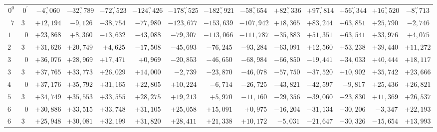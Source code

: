 \begin{landscape}
\begin{longtable}{@{}rr|r|r|r|r|r|r|r|r|r|r|r|r@{}}
\hline
\endhead
\(0^0\) & \(0^\prime\) & \(-4\overset{\prime\prime}{,}060\) & \(-32\overset{\prime\prime}{,}789\) & \(-72\overset{\prime\prime}{,}523\) & \(-124\overset{\prime\prime}{,}426\) & \(-178\overset{\prime\prime}{,}525\) & \(-182\overset{\prime\prime}{,}921\) & \(-58\overset{\prime\prime}{,}654\) & \(+82\overset{\prime\prime}{,}336\) & \(+97\overset{\prime\prime}{,}814\) & \(+56\overset{\prime\prime}{,}344\) & \(+16\overset{\prime\prime}{,}520\) & \(-8\overset{\prime\prime}{,}713\)\\
\(7\) & \(30\) & \(+12{,}194\) & \(-9{,}126\) & \(-38{,}754\) & \(-77{,}980\) & \(-123{,}677\) & \(-153{,}639\) & \(-107{,}942\) & \(+18{,}365\) & \(+83{,}244\) & \(+63{,}851\) & \(+25{,}790\) & \(-2{,}746\)\\
\(15\) & \(0\) & \(+23{,}868\) & \(+8{,}360\) & \(-13{,}632\) & \(-43{,}088\) & \(-79{,}307\) & \(-113{,}066\) & \(-111{,}787\) & \(-35{,}883\) & \(+51{,}351\) & \(+63{,}541\) & \(+33{,}976\) & \(+4{,}075\)\\
\(22\) & \(30\) & \(+31{,}626\) & \(+20{,}749\) & \(+4{,}625\) & \(-17{,}508\) & \(-45{,}693\) & \(-76{,}245\) & \(-93{,}284\) & \(-63{,}091\) & \(+12{,}560\) & \(+53{,}238\) & \(+39{,}440\) & \(+11{,}272\)\\[2pt]
\(30\) & \(0\) & \(+36{,}076\) & \(+28{,}969\) & \(+17{,}471\) & \(+0{,}969\) & \(-20{,}853\) & \(-46{,}650\) & \(-68{,}984\) & \(-66{,}850\) & \(-19{,}441\) & \(+34{,}033\) & \(+40{,}444\) & \(+18{,}117\)\\
\(37\) & \(30\) & \(+37{,}765\) & \(+33{,}773\) & \(+26{,}029\) & \(+14{,}000\) & \(-2{,}739\) & \(-23{,}870\) & \(-46{,}078\) & \(-57{,}750\) & \(-37{,}520\) & \(+10{,}902\) & \(+35{,}742\) & \(+23{,}666\)\\
\(45\) & \(0\) & \(+37{,}176\) & \(+35{,}792\) & \(+31{,}165\) & \(+22{,}805\) & \(+10{,}224\) & \(-6{,}714\) & \(-26{,}725\) & \(-43{,}821\) & \(-42{,}597\) & \(-9{,}817\) & \(+25{,}436\) & \(+26{,}821\)\\
\(52\) & \(30\) & \(+34{,}749\) & \(+35{,}553\) & \(+33{,}555\) & \(+28{,}275\) & \(+19{,}213\) & \(+5{,}970\) & \(-11{,}160\) & \(-29{,}356\) & \(-39{,}060\) & \(-23{,}830\) & \(+11{,}369\) & \(+26{,}537\)\\[2pt]
\(60\) & \(0\) & \(+30{,}886\) & \(+33{,}515\) & \(+33{,}748\) & \(+31{,}105\) & \(+25{,}058\) & \(+15{,}091\) & \(+0{,}975\) & \(-16{,}204\) & \(-31{,}134\) & \(-30{,}206\) & \(-3{,}347\) & \(+22{,}193\)\\
\(67\) & \(30\) & \(+25{,}948\) & \(+30{,}081\) & \(+32{,}199\) & \(+31{,}820\) & \(+28{,}411\) & \(+21{,}338\) & \(+10{,}172\) & \(-5{,}031\) & \(-21{,}647\) & \(-30{,}326\) & \(-15{,}654\) & \(+13{,}993\)\\

\end{longtable}
\end{landscape}

